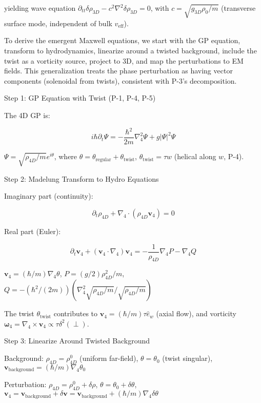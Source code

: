 yielding wave equation $\partial_{tt} \delta \rho_{3D} - c^2 \nabla^2 \delta \rho_{3D} = 0$, with $c = \sqrt{g_{3D} \rho_0 / m}$ (transverse surface mode, independent of bulk $v_{\text{eff}}$).

To derive the emergent Maxwell equations, we start with the GP equation, transform to hydrodynamics, linearize around a twisted background, include the twist as a vorticity source, project to 3D, and map the perturbations to EM fields. This generalization treats the phase perturbation as having vector components (solenoidal from twists), consistent with P-3's decomposition. 

Step 1: GP Equation with Twist (P-1, P-4, P-5)

The 4D GP is:

\[ i \hbar \partial_t \Psi = - \frac{\hbar^2}{2m} \nabla_4^2 \Psi + g |\Psi|^2 \Psi \]

$\Psi = \sqrt{\rho_{4D} / m} e^{i \theta}$, where $\theta = \theta_{\text{regular}} + \theta_{\text{twist}}$, $\theta_{\text{twist}} = \tau w$ (helical along $w$, P-4).

Step 2: Madelung Transform to Hydro Equations

Imaginary part (continuity):

\[ \partial_t \rho_{4D} + \nabla_4 \cdot (\rho_{4D} \mathbf{v}_4) = 0 \]

Real part (Euler):

\[ \partial_t \mathbf{v}_4 + (\mathbf{v}_4 \cdot \nabla_4) \mathbf{v}_4 = - \frac{1}{\rho_{4D}} \nabla_4 P - \nabla_4 Q \]

$\mathbf{v}_4 = (\hbar / m) \nabla_4 \theta$, $P = (g / 2) \rho_{4D}^2 / m$, $Q = - (\hbar^2 / (2m)) (\nabla_4^2 \sqrt{\rho_{4D} / m} / \sqrt{\rho_{4D} / m})$

The twist $\theta_{\text{twist}}$ contributes to $\mathbf{v}_4 = (\hbar / m) \tau \hat{e}_w$ (axial flow), and vorticity $\boldsymbol{\omega}_4 = \nabla_4 \times \mathbf{v}_4 \propto \tau \delta^2(\perp)$.

Step 3: Linearize Around Twisted Background

Background: $\rho_{4D} = \rho_{4D}^0$ (uniform far-field), $\theta = \theta_0$ (twist singular), $\mathbf{v}_{\text{background}} = (\hbar / m) \nabla_4 \theta_0$

Perturbation: $\rho_{4D} = \rho_{4D}^0 + \delta\rho$, $\theta = \theta_0 + \delta\theta$, $\mathbf{v}_4 = \mathbf{v}_{\text{background}} + \delta\mathbf{v} = \mathbf{v}_{\text{background}} + (\hbar / m) \nabla_4 \delta\theta$

